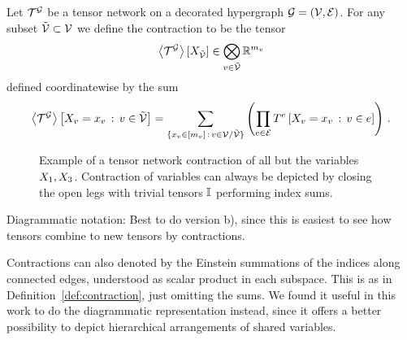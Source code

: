 \begin{definition}\label{def:contraction}
	Let $\mathcal{T}^{\mathcal{G}}$ be a tensor network on a decorated hypergraph $\mathcal{G}=(\mathcal{V},\mathcal{E})$.
	For any subset $\tilde{\mathcal{V}}\subset\mathcal{V}$ we define the contraction  to be the tensor 
	\begin{align}
		\left\langle \mathcal{T}^{\mathcal{G}}\right\rangle \left[ X_{\tilde{\mathcal{V}}} \right] \in \bigotimes_{v\in\tilde{\mathcal{V}}} \mathbb{R}^{m_{v}}
	\end{align}
	defined coordinatewise by the sum	
	\begin{align}
		\left\langle \mathcal{T}^{\mathcal{G}}\right\rangle \left[ X_{v}=x_{v} \, : \, v\in\tilde{\mathcal{V}} \right] =
		\sum_{\{x_{v} \in [m_{v}] \, : \, v \in \mathcal{V}/\tilde{\mathcal{V}}\}}
		\left( \prod_{e\in\mathcal{E}}T^{e}\left[X_{v}=x_{v} \, : \, v\in e\right] \right) \, .
	\end{align}
\end{definition}

\begin{figure}
	\begin{center}
		
	\end{center}
	\caption{
		Example of a tensor network contraction of all but the variables $X_{1},X_{3}$.
		Contraction of variables can always be depicted by closing the open legs with trivial tensors $\mathbb{I}$ performing index sums.
	}\label{fig:contraction}
\end{figure}



Diagrammatic notation: Best to do version b), since this is easiest to see how tensors combine to new tensors by contractions.

\begin{remark}
	Contractions can also denoted by the Einstein summations of the indices along connected edges, understood as scalar product in each subspace.
	This is as in Definition~\ref{def:contraction}, just omitting the sums.
	We found it useful in this work to do the diagrammatic representation instead, since it offers a better possibility to depict hierarchical arrangements of shared variables.
\end{remark}


